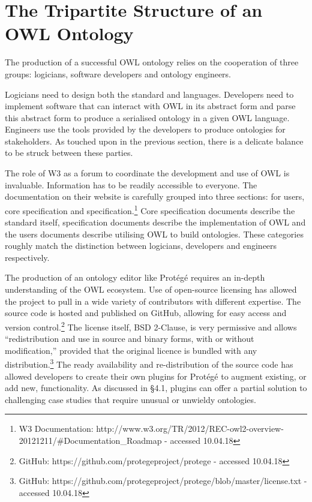 \documentclass[titlepage,a4paper,12pt,oneside]{book}
\begin{document}
\section{The Tripartite Structure of an OWL Ontology}
The production of a successful OWL ontology relies on the cooperation of three groups: logicians, software developers and ontology engineers.\par
Logicians need to design both the standard and languages.
Developers need to implement software that can interact with OWL in its abstract form and parse this abstract form to produce a serialised ontology in a given OWL language. 
Engineers use the tools provided by the developers to produce ontologies for stakeholders.
As touched upon in the previous section, there is a delicate balance to be struck between these parties.\par
The role of W3 as a forum to coordinate the development and use of OWL is invaluable.
Information has to be readily accessible to everyone.
The documentation on their website is carefully grouped into three sections: for users, core specification and specification.\footnote{W3 Documentation: http://www.w3.org/TR/2012/REC-owl2-overview-20121211/\#Documentation\_Roadmap - accessed 10.04.18}
Core specification documents describe the standard itself, specification documents describe the implementation of OWL and the users documents describe utilising OWL to build ontologies.
These categories roughly match the distinction between logicians, developers and engineers respectively.\par
The production of an ontology editor like Protégé requires an in-depth understanding of the OWL ecosystem.
Use of open-source licensing has allowed the project to pull in a wide variety of contributors with different expertise.
The source code is hosted and published on GitHub, allowing for easy access and version control.\footnote{GitHub: https://github.com/protegeproject/protege - accessed 10.04.18}
The license itself, BSD 2-Clause, is very permissive and allows ``redistribution and use in source and binary forms, with or without modification,'' provided that the original licence is bundled with any distribution.\footnote{GitHub: https://github.com/protegeproject/protege/blob/master/license.txt - accessed 10.04.18}
The ready availability and re-distribution of the source code has allowed developers to create their own plugins for Protégé to augment existing, or add new, functionality.
As discussed in §4.1, plugins can offer a partial solution to challenging case studies that require unusual or unwieldy ontologies.\par
\end{document}
